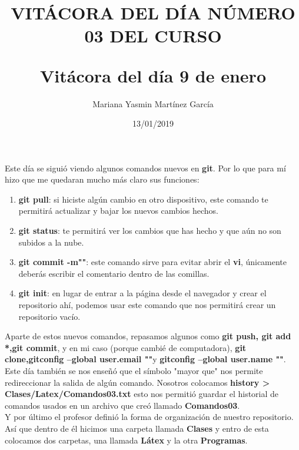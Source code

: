 \documentclass[letterpaper, 12pt, twoside]{article}
\title{\Huge\item\color{red}\textbf {VITÁCORA DEL DÍA NÚMERO 03 DEL CURSO}}
\author{Mariana Yasmin Martínez García}
\date{13/01/2019}
\begin{document}
	\maketitle
	
	\newpage
	
	\title{\huge\textbf{Vitácora del día 9 de enero\\}}
	Este día se siguió viendo algunos comandos nuevos en \textbf{git}. Por lo que para mí hizo que me quedaran mucho más claro sus funciones:
	\begin{enumerate}
		\item\textbf{\large git pull}: si hiciste algún cambio en otro dispositivo, este comando te permitirá actualizar y bajar los nuevos cambios hechos.
		\item\textbf{\large git status}: te permitirá ver los cambios que has hecho y que aún no son subidos a la nube.
		\item\textbf{\large git commit -m""}: este comando sirve para evitar abrir el \textbf{vi}, únicamente deberás escribir el comentario dentro de las comillas.
		\item\textbf{\large git init}: en lugar de entrar a la página desde el navegador y crear el repositorio ahí, podemos usar este comando que nos permitirá crear un repositorio vacío.
	\end{enumerate}
    Aparte de estos nuevos comandos, repasamos algunos como \textbf{git push, git add *,git commit}, y en mi caso (porque cambié de computadora), \textbf{git clone,gitconfig --global user.email ""}y \textbf{gitconfig --global user.name ""}. \newline
	Este día también se nos enseñó que el símbolo "mayor que" nos permite redireccionar la salida de algún comando. Nosotros colocamos \textbf{history > Clases/Latex/Comandos03.txt} esto nos permitió guardar el historial de comandos usados en un archivo que creó llamado \textbf{Comandos03}. \\
	Y por último el profesor definió la forma de organización de nuestro repositorio. Así que dentro de él hicimos una carpeta llamada \textbf{Clases} y entro de esta colocamos dos carpetas, una llamada \textbf{Látex} y la otra \textbf{Programas}.
	
\end{document}
